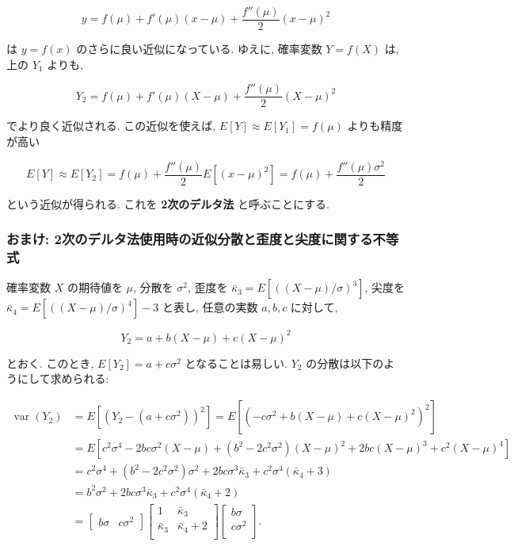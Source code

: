 \documentclass[10pt, a4paper,xelatex,ja=standard]{bxjsarticle}
\newcommand\op{\operatorname}
\newcommand\bk{\bar\kappa}
\begin{document}
\[
y = f(\mu) + f'(\mu)(x - \mu) + \frac{f''(\mu)}{2}(x - \mu)^2
\]

は \(y = f(x)\) のさらに良い近似になっている. ゆえに, 確率変数
\(Y=f(X)\) は, 上の \(Y_1\) よりも,

\[
Y_2 = f(\mu) + f'(\mu)(X - \mu) + \frac{f''(\mu)}{2}(X - \mu)^2
\]

でより良く近似される. この近似を使えば, \(E[Y]\approx E[Y_1] = f(\mu)\)
よりも精度が高い

\[
E[Y] \approx E[Y_2] = f(\mu) + \frac{f''(\mu)}{2}E[(x - \mu)^2] =
f(\mu) + \frac{f''(\mu)\sigma^2}{2}
\]

という近似が得られる. これを \textbf{2次のデルタ法} と呼ぶことにする.

    \hypertarget{ux304aux307eux3051-2ux6b21ux306eux30c7ux30ebux30bfux6cd5ux4f7fux7528ux6642ux306eux8fd1ux4f3cux5206ux6563ux3068ux6b6aux5ea6ux3068ux5c16ux5ea6ux306bux95a2ux3059ux308bux4e0dux7b49ux5f0f}{%
\subsubsection{おまけ:
2次のデルタ法使用時の近似分散と歪度と尖度に関する不等式}\label{ux304aux307eux3051-2ux6b21ux306eux30c7ux30ebux30bfux6cd5ux4f7fux7528ux6642ux306eux8fd1ux4f3cux5206ux6563ux3068ux6b6aux5ea6ux3068ux5c16ux5ea6ux306bux95a2ux3059ux308bux4e0dux7b49ux5f0f}}

確率変数 \(X\) の期待値を \(\mu\), 分散を \(\sigma^2\), 歪度を
\(\bk_3=E[((X-\mu)/\sigma)^3]\), 尖度を
\(\bk_4=E[((X-\mu)/\sigma)^4]-3\) と表し, 任意の実数 \(a,b,c\) に対して,

\[
Y_2 = a + b(X-\mu) + c(X-\mu)^2
\]

とおく. このとき, \(E[Y_2]=a+c\sigma^2\) となることは易しい. \(Y_2\)
の分散は以下のようにして求められる:

\[
\begin{aligned}
\op{var}(Y_2) &=
E[(Y_2 - (a+c\sigma^2))^2] =
E[(-c\sigma^2 + b(X-\mu) + c(X-\mu)^2)^2]
\\ &=
E[c^2\sigma^4 -2bc\sigma^2(X-\mu) + (b^2 - 2c^2\sigma^2)(X-\mu)^2 +
2bc(X-\mu)^3 + c^2(X-\mu)^4]
\\ &=
c^2\sigma^4 + (b^2 - 2c^2\sigma^2)\sigma^2 + 2bc\sigma^3\bk_3 + c^2\sigma^4(\bk_4 + 3)
\\ &=
b^2\sigma^2 + 2bc\sigma^3\bk_3 + c^2\sigma^4(\bk_4 + 2)
\\ &=
\begin{bmatrix} b\sigma & c\sigma^2 \end{bmatrix}
\begin{bmatrix}
1     & \bk_3 \\
\bk_3 & \bk_4 + 2 \\
\end{bmatrix}
\begin{bmatrix}
b\sigma \\
c\sigma^2 \\
\end{bmatrix}.
\end{aligned}
\]
\end{document}

